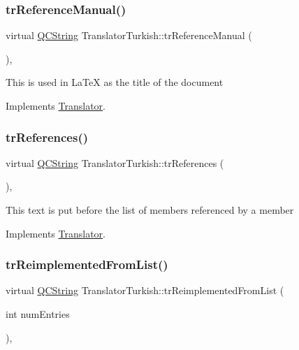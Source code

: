 \subsubsection{\texorpdfstring{trReferenceManual()}{trReferenceManual()}}
{\footnotesize\ttfamily virtual \mbox{\hyperlink{class_q_c_string}{Q\+C\+String}} Translator\+Turkish\+::tr\+Reference\+Manual (\begin{DoxyParamCaption}{ }\end{DoxyParamCaption})\hspace{0.3cm}{\ttfamily [inline]}, {\ttfamily [virtual]}}

This is used in La\+TeX as the title of the document 

Implements \mbox{\hyperlink{class_translator}{Translator}}.

\mbox{\label{class_translator_turkish_a24b018c2a9f9624222f88258f4396c9d}} 
\subsubsection{\texorpdfstring{trReferences()}{trReferences()}}
{\footnotesize\ttfamily virtual \mbox{\hyperlink{class_q_c_string}{Q\+C\+String}} Translator\+Turkish\+::tr\+References (\begin{DoxyParamCaption}{ }\end{DoxyParamCaption})\hspace{0.3cm}{\ttfamily [inline]}, {\ttfamily [virtual]}}

This text is put before the list of members referenced by a member 

Implements \mbox{\hyperlink{class_translator}{Translator}}.

\mbox{\label{class_translator_turkish_abfdb487a89f1f840e4c2d4f1c6a9afd5}} 
\subsubsection{\texorpdfstring{trReimplementedFromList()}{trReimplementedFromList()}}
{\footnotesize\ttfamily virtual \mbox{\hyperlink{class_q_c_string}{Q\+C\+String}} Translator\+Turkish\+::tr\+Reimplemented\+From\+List (\begin{DoxyParamCaption}\item[{int}]{num\+Entries }\end{DoxyParamCaption})\hspace{0.3cm}{\ttfamily [inline]}, {\ttfamily [virtual]}}

